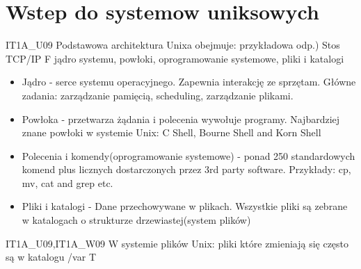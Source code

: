 \chapter{Wstep do systemow uniksowych}
\PartialToc
\vspace{0.4cm}
\noindent  

\answer
{IT1A\_U09 Podstawowa architektura Unixa obejmuje:}
{przykładowa odp.) Stos TCP/IP}
{F}
{jądro systemu, powłoki, oprogramowanie systemowe, pliki i katalogi}
{
\begin{itemize}
\item Jądro - serce systemu operacyjnego. Zapewnia interakcję ze sprzętam. Główne zadania: zarządzanie pamięcią, scheduling, zarządzanie plikami.

\item Powłoka - przetwarza żądania i polecenia wywołuje programy. Najbardziej znane powłoki w systemie Unix: C Shell, Bourne Shell and Korn Shell

\item Polecenia i komendy(oprogramowanie systemowe) - ponad 250 standardowych komend plus licznych dostarczonych przez 3rd party software. Przykłady: cp, mv, cat and grep etc.

\item Pliki i katalogi - Dane przechowywane w plikach. Wszystkie pliki są zebrane w katalogach o strukturze drzewiastej(system plików)
\end{itemize}
}
\answer
{IT1A\_U09,IT1A\_W09 W systemie plików Unix:}
{pliki które zmieniają się często są w katalogu /var}
{T}
